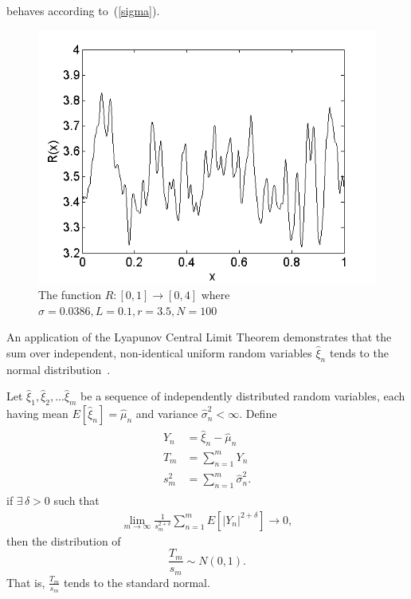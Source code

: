 behaves according to~(\ref{sigma}).
\begin{figure}[!h]
\caption[The function $R(x)$]{The function $R:[0,1]\to [0,4]$ where
  $\sigma=0.0386, L=0.1, r=3.5, N=100$}\label{fig:R}
	\begin{center}
		\includegraphics[scale=0.6]{figs/xi.png}
	\end{center}
\end{figure}

An application of the Lyapunov Central
Limit Theorem demonstrates that the sum over independent, non-identical uniform
random variables $\hat{\xi}_n$ tends to the normal distribution~\cite{billingsley}.

\begin{singlespacing}
\begin{theorem}\label{clt}
Let $\hat{\xi}_1, \hat{\xi}_2, ...\hat{\xi}_m$ be a sequence of independently distributed random
variables, each having mean $E[\hat{\xi}_n]=\hat{\mu}_n$ and variance
$\hat{\sigma}_n^2 < \infty$. Define
\begin{align*}
\begin{split}
Y_n &=\hat{\xi}_n - \hat{\mu}_n\\
T_m &= \sum_{n=1}^{m}Y_n\\
s_m^2 &=\sum_{n=1}^m\hat{\sigma}_n^2.
\end{split}
\end{align*}
if $\exists\, \delta>0$ such that 
\begin{align*}
\lim_{m\to \infty}\frac{1}{s_m^{2+\delta}}\sum_{n=1}^mE[|Y_n|^{2+\delta}] \to 0,
\end{align*}
then the distribution of
\begin{equation*}
\frac{T_m}{s_m} \sim N(0,1).
\end{equation*}
That is, $\frac{T_m}{s_m}$ tends to the standard normal.
\end{theorem}
\end{singlespacing}

